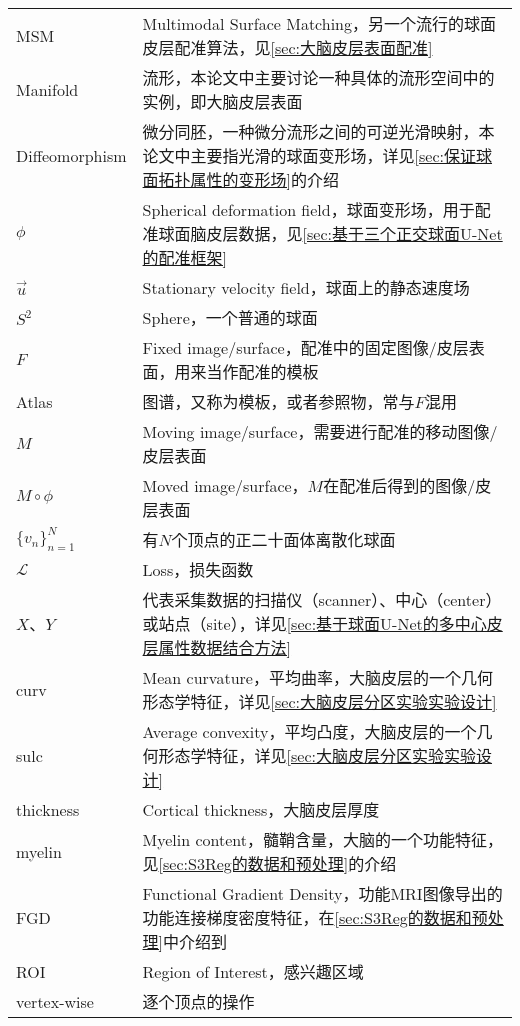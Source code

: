 \begin{center}
\begin{longtable}{>{\raggedleft}p{}  p{}}
            MSM & Multimodal Surface Matching，另一个流行的球面皮层配准算法，见\ref{sec:大脑皮层表面配准} \\
            Manifold & 流形，本论文中主要讨论一种具体的流形空间中的实例，即大脑皮层表面 \\
            Diffeomorphism & 微分同胚，一种微分流形之间的可逆光滑映射，本论文中主要指光滑的球面变形场，详见\ref{sec:保证球面拓扑属性的变形场}的介绍 \\
            $\phi$  & Spherical deformation field，球面变形场，用于配准球面脑皮层数据，见\ref{sec:基于三个正交球面U-Net的配准框架} \\
            $\overrightarrow{u}$ &  Stationary velocity field，球面上的静态速度场 \\
            $S^2$ & Sphere，一个普通的球面 \\
            $F$ & Fixed image/surface，配准中的固定图像/皮层表面，用来当作配准的模板 \\
            Atlas & 图谱，又称为模板，或者参照物，常与$F$混用 \\
            $M$ & Moving image/surface，需要进行配准的移动图像/皮层表面 \\
            $M\circ \phi$ & Moved image/surface，$M$在配准后得到的图像/皮层表面 \\
            ${\{v_n\}}_{n=1}^N$ & 有$N$个顶点的正二十面体离散化球面 \\
            $\mathcal{L}$ & Loss，损失函数 \\
            $X$、$Y$ & 代表采集数据的扫描仪（scanner）、中心（center）或站点（site），详见\ref{sec:基于球面U-Net的多中心皮层属性数据结合方法} \\
            curv      &    Mean curvature，平均曲率，大脑皮层的一个几何形态学特征，详见\ref{sec:大脑皮层分区实验实验设计} \\
            sulc      & Average convexity，平均凸度，大脑皮层的一个几何形态学特征，详见\ref{sec:大脑皮层分区实验实验设计} \\
            thickness & Cortical thickness，大脑皮层厚度  \\
            myelin   & Myelin content，髓鞘含量，大脑的一个功能特征，见\ref{sec:S3Reg的数据和预处理}的介绍 \\
            FGD     & Functional Gradient Density，功能MRI图像导出的功能连接梯度密度特征，在\ref{sec:S3Reg的数据和预处理}中介绍到 \\
            ROI    &  Region of Interest，感兴趣区域 \\
            vertex-wise &  逐个顶点的操作 \\

\end{longtable}
\end{center}
